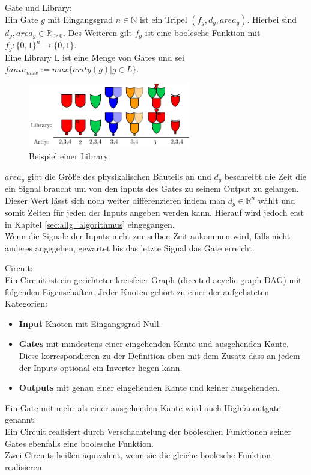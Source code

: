 \documentclass[11pt, a4paper, german]{article}
\begin{document}
\begin{definition}{Gate und Library:}\\
Ein Gate $g$ mit Eingangsgrad $ n \in \mathbb{N}$ ist ein Tripel $(f_g, d_g, area_g)$. Hierbei sind $d_g, area_g \in \mathbb{R}_{\geq 0}$. Des Weiteren gilt $f_g$ ist eine boolesche Funktion mit $ f_g : \{0,1\}^n \rightarrow \{0, 1\} $. \\
Eine Library L ist eine Menge von Gates und sei \\ 
$fanin_{max} := max\{ arity(g) | g \in L \}$.
\end{definition}
\begin{figure}[h]
\begin{center}
 \includegraphics[height = 80pt]{./pictures/compiled/new_library.pdf}
 \caption{Beispiel einer Library}
 \label{bild:new_library}
\end{center}
\end{figure}
$area_g$ gibt die Größe des physikalischen Bauteils an und $d_g$ beschreibt die Zeit die ein Signal braucht um von den inputs des Gates zu seinem Output zu gelangen. Dieser Wert lässt sich noch weiter differenzieren indem man $d_g \in \mathbb{R}^n$ wählt und somit Zeiten für jeden der Inputs angeben werden kann. Hierauf wird jedoch erst in Kapitel \ref{sec:allg_algorithmus} eingegangen. \\
Wenn die Signale der Inputs nicht zur selben Zeit ankommen wird, falls nicht anderes angegeben, gewartet bis das letzte Signal das Gate erreicht.

\begin{definition}{Circuit:}\\
Ein Circuit ist ein gerichteter kreisfeier Graph (directed acyclic graph DAG) mit folgenden Eigenschaften. Jeder Knoten gehört zu einer der aufgelisteten Kategorien: 
\begin{itemize}
\item{\bf Input} Knoten mit Eingangsgrad Null.
\item{\bf Gates} mit mindestens einer eingehenden Kante und ausgehenden Kante. Diese korrespondieren zu der Definition oben mit dem Zusatz dass an jedem der Inputs optional ein Inverter liegen kann.
\item{\bf Outputs} mit genau einer eingehenden Kante und keiner ausgehenden.
\end{itemize}
Ein Gate mit mehr als einer ausgehenden Kante wird auch Highfanoutgate genannt.\\
Ein Circuit realisiert durch Verschachtelung der booleschen Funktionen seiner Gates ebenfalls eine boolesche Funktion. \\
Zwei Circuits heißen äquivalent, wenn sie die gleiche boolesche Funktion realisieren.
\end{definition}
\end{document}
